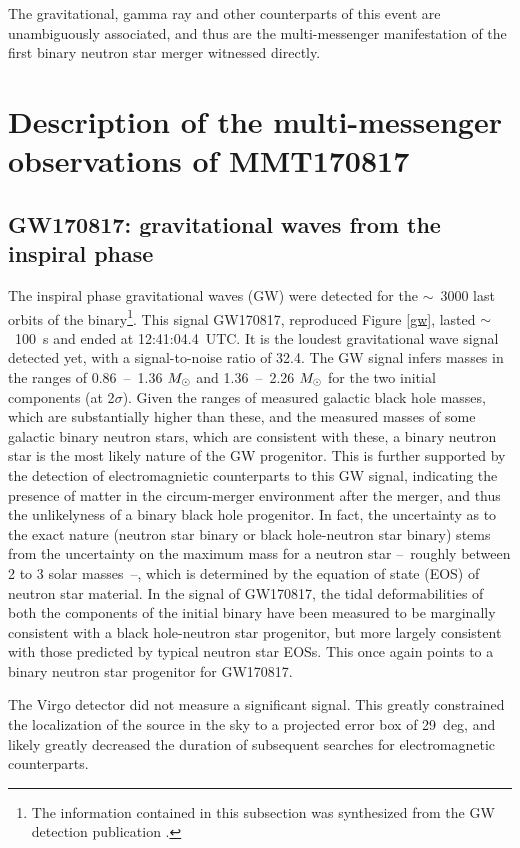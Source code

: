 The gravitational, gamma ray and other counterparts of this event are unambiguously associated, and thus are the multi-messenger manifestation of the first binary neutron star merger witnessed directly.

\section{Description of the multi-messenger observations of MMT170817}

\subsection{GW170817: gravitational waves from the inspiral phase}

The inspiral phase gravitational waves (GW) were detected for the $\sim$~3000 last orbits of the binary\footnote{The information contained in this subsection was synthesized from the GW detection publication \citep{23}.}. This signal GW170817, reproduced Figure \ref{gw}, lasted $\sim$~100~s and ended at 12:41:04.4~UTC. It is the loudest gravitational wave signal detected yet, with a signal-to-noise ratio of 32.4. The GW signal infers masses in the ranges of 0.86~--~1.36 $M_{\odot}$ and 1.36~--~2.26 $M_{\odot}$ for the two initial components (at 2$\sigma$). Given the ranges of measured galactic black hole masses, which are substantially higher than these, and the measured masses of some galactic binary neutron stars, which are consistent with these, a binary neutron star is the most likely nature of the GW progenitor. This is further supported by the detection of electromagnietic counterparts to this GW signal, indicating the presence of matter in the circum-merger environment after the merger, and thus the unlikelyness of a binary black hole progenitor. In fact, the uncertainty as to the exact nature (neutron star binary or black hole-neutron star binary) stems from the uncertainty on the maximum mass for a neutron star --~roughly between 2 to 3 solar masses~--, which is determined by the equation of state (EOS) of neutron star material. In the signal of GW170817, the tidal deformabilities of both the components of the initial binary have been measured to be marginally consistent with a black hole-neutron star progenitor, but more largely consistent with those predicted by typical neutron star EOSs. This once again points to a binary neutron star progenitor for GW170817.

The Virgo detector did not measure a significant signal. This greatly constrained the localization of the source in the sky to a projected error box of 29~deg, and likely greatly decreased the duration of subsequent searches for electromagnetic counterparts.

